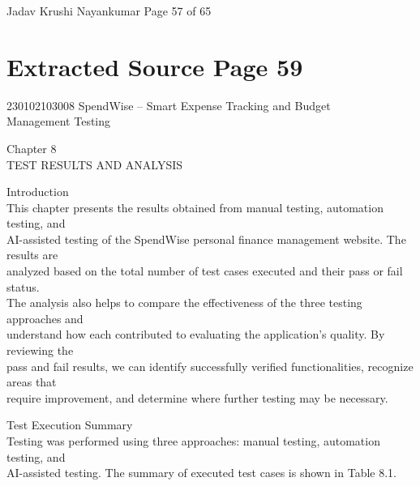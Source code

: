\documentclass[12pt,a4paper]{report}
\begin{document}
\smallskip

\smallskip

\smallskip

\smallskip
Jadav Krushi Nayankumar                                                            Page 57 of 65\\ 

\clearpage
\section*{Extracted Source Page 59}
230102103008                            SpendWise – Smart Expense Tracking and Budget\\ 
Management Testing\\ 

\smallskip

\smallskip

\smallskip
Chapter 8\\ 

\smallskip
TEST RESULTS AND ANALYSIS\\ 

\smallskip

 Introduction\\ 

\smallskip
This chapter presents the results obtained from manual testing, automation testing, and\\ 
AI-assisted testing of the SpendWise personal finance management website. The results are\\ 
analyzed based on the total number of test cases executed and their pass or fail status.\\ 
The analysis also helps to compare the effectiveness of the three testing approaches and\\ 
understand how each contributed to evaluating the application’s quality. By reviewing the\\ 
pass and fail results, we can identify successfully verified functionalities, recognize areas that\\ 
require improvement, and determine where further testing may be necessary.\\ 

\smallskip

 Test Execution Summary\\ 

\smallskip
Testing was performed using three approaches: manual testing, automation testing, and\\ 
AI-assisted testing. The summary of executed test cases is shown in Table 8.1.\\ 
\end{document}
